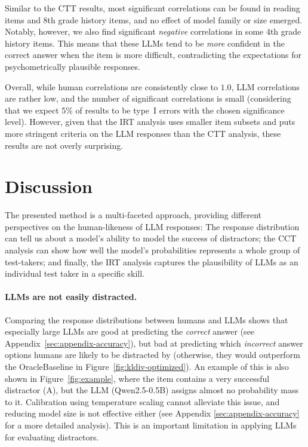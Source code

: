 \documentclass[11pt]{article}
\begin{document}
Similar to the CTT results, most significant correlations can be found in reading items and 8th grade history items, and no effect of model family or size emerged. Notably, however, we also find significant \emph{negative} correlations in some 4th grade history items. This means that these LLMs tend to be \emph{more} confident in the correct answer when the item is more difficult, contradicting the expectations for psychometrically plausible responses.

Overall, while human correlations are consistently close to $1.0$, LLM correlations are rather low, and the number of significant correlations is small (considering that we expect 5\% of results to be type~I errors with the chosen significance level). However, given that the IRT analysis uses smaller item subsets and puts more stringent criteria on the LLM responses than the CTT analysis, these results are not overly surprising.


\section{Discussion}

The presented method is a multi-faceted approach, providing different perspectives on the human-likeness of LLM responses: The response distribution can tell us about a model's ability to model the success of distractors; the CCT analysis can show how well the model's probabilities represents a whole group of test-takers; and finally, the IRT analysis captures the plausibility of LLMs as an individual test taker in a specific skill.

\paragraph{LLMs are not easily distracted.}

Comparing the response distributions between humans and LLMs shows that especially large LLMs are good at predicting the \emph{correct} answer (see Appendix~\ref{sec:appendix-accuracy}), but bad at predicting which \emph{incorrect} answer options humans are likely to be distracted by (otherwise, they would outperform the OracleBaseline in Figure~\ref{fig:kldiv-optimized}). An example of this is also shown in Figure~\ref{fig:example}, where the item contains a very successful distractor (A), but the LLM (Qwen2.5-0.5B) assigns almost no probability mass to it. Calibration using temperature scaling cannot alleviate this issue, and reducing model size is not effective either (see Appendix \ref{sec:appendix-accuracy} for a more detailed analysis). This is an important limitation in applying LLMs for evaluating distractors.
\end{document}
